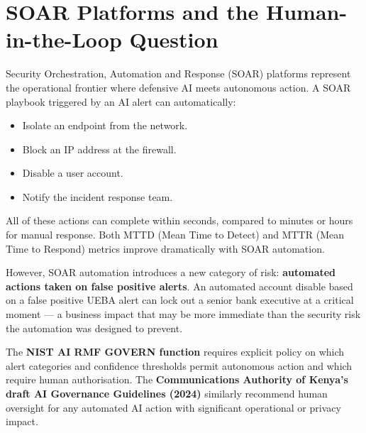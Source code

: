 \documentclass[12pt,a4paper]{article}
\begin{document}
\section{SOAR Platforms and the Human-in-the-Loop Question}

Security Orchestration, Automation and Response (SOAR) platforms represent the operational frontier where defensive AI meets autonomous action. A SOAR playbook triggered by an AI alert can automatically:
\begin{itemize}
    \item Isolate an endpoint from the network.
    \item Block an IP address at the firewall.
    \item Disable a user account.
    \item Notify the incident response team.
\end{itemize}
All of these actions can complete within seconds, compared to minutes or hours for manual response. Both MTTD (Mean Time to Detect) and MTTR (Mean Time to Respond) metrics improve dramatically with SOAR automation.

However, SOAR automation introduces a new category of risk: \textbf{automated actions taken on false positive alerts}. An automated account disable based on a false positive UEBA alert can lock out a senior bank executive at a critical moment --- a business impact that may be more immediate than the security risk the automation was designed to prevent.

The \textbf{NIST AI RMF GOVERN function} requires explicit policy on which alert categories and confidence thresholds permit autonomous action and which require human authorisation. The \textbf{Communications Authority of Kenya's draft AI Governance Guidelines (2024)} similarly recommend human oversight for any automated AI action with significant operational or privacy impact.
\end{document}
